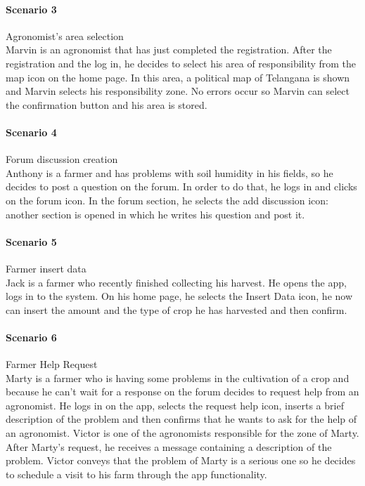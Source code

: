 \bigskip
\paragraph{Scenario 3} Agronomist's area selection\\
Marvin is an agronomist that has just completed the registration. After the registration and the log in,
he decides to select his area of responsibility from the map icon on the home page. In this area, a political map of
Telangana is shown and Marvin selects his responsibility zone. No errors occur so Marvin can select the confirmation
button and his area is stored.

\bigskip
\paragraph{Scenario 4} Forum discussion creation\\
Anthony is a farmer and has problems with soil humidity in his fields, so he decides to post a question on the forum.
In order to do that, he logs in and clicks on the forum icon. In the forum section, he selects the add discussion icon:
another section is opened in which he writes his question and post it.

\bigskip
\paragraph{Scenario 5} Farmer insert data\\
Jack is a farmer who recently finished collecting his harvest. He opens the app, logs in to the system. On his home page, 
he selects the Insert Data icon, he now can insert the amount and the type of crop he has harvested and then confirm.

\bigskip
\paragraph{Scenario 6} Farmer Help Request\\
Marty is a farmer who is having some problems in the cultivation of a crop and because he can't wait for a response on the 
forum decides to request help from an agronomist. He logs in on the app, selects the request help icon, inserts a brief description 
of the problem and then confirms that he wants to ask for the help of an agronomist. Victor is one of the agronomists responsible 
for the zone of Marty. After Marty's request, he receives a message containing a description of the problem. Victor conveys that the 
problem of Marty is a serious one so he decides to schedule a visit to his farm through the app functionality.


